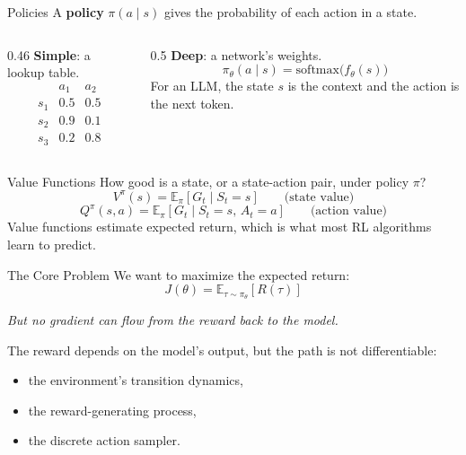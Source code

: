 \documentclass[aspectratio=169]{beamer}
\begin{document}
\begin{frame}{Policies}
A \textbf{policy} $\pi(a \mid s)$ gives the probability of each action in a state.
\vspace{0.5em}
\begin{columns}[T]
\begin{column}{0.46\textwidth}
\textbf{Simple}: a lookup table.
\[
\begin{array}{c|cc}
 & a_1 & a_2 \\ \hline
s_1 & 0.5 & 0.5 \\
s_2 & 0.9 & 0.1 \\
s_3 & 0.2 & 0.8
\end{array}
\]
\end{column}
\begin{column}{0.5\textwidth}
\textbf{Deep}: a network's weights.
\[
\pi_\theta(a \mid s) = \mathrm{softmax}\big(f_\theta(s)\big)
\]
For an LLM, the state $s$ is the context and the action is the next token.
\end{column}
\end{columns}
\end{frame}

\begin{frame}{Value Functions}
How good is a state, or a state-action pair, under policy $\pi$?
\[
V^\pi(s) = \mathbb{E}_\pi\!\left[ G_t \mid S_t = s \right]
\qquad\text{(state value)}
\]
\[
Q^\pi(s, a) = \mathbb{E}_\pi\!\left[ G_t \mid S_t = s,\, A_t = a \right]
\qquad\text{(action value)}
\]
Value functions estimate expected return, which is what most RL algorithms learn to predict.
\end{frame}

\begin{frame}{The Core Problem}
We want to maximize the expected return:
\[
J(\theta) = \mathbb{E}_{\tau \sim \pi_\theta}\!\left[ R(\tau) \right]
\]
\begin{center}
\emph{But no gradient can flow from the reward back to the model.}
\end{center}
\vspace{0.3em}
The reward depends on the model's output, but the path is not differentiable:
\begin{itemize}
\item the environment's transition dynamics,
\item the reward-generating process,
\item the discrete action sampler.
\end{itemize}
\end{frame}
\end{document}
